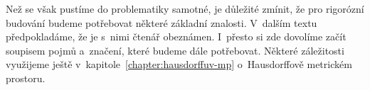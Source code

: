 Než se však pustíme do problematiky samotné, je důležité zmínit, že pro rigorózní budování budeme potřebovat některé základní znalosti. V~dalším textu předpokladáme, že je s~nimi čtenář obeznámen. I~přesto si zde dovolíme začít soupisem pojmů a~značení, které budeme dále potřebovat. Některé záležitosti využijeme ještě v~kapitole~\ref{chapter:hausdorffuv-mp} o~Hausdorffově metrickém prostoru.





